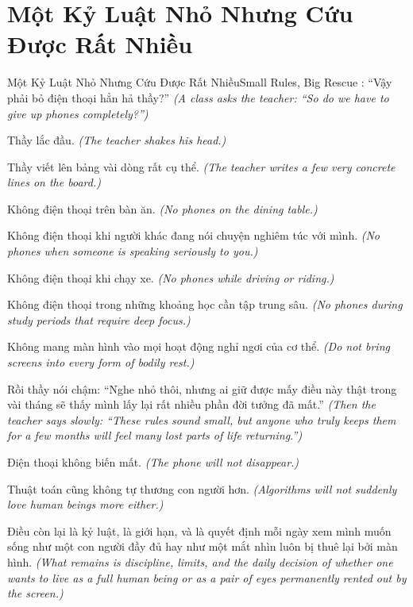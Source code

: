 \section{Một Kỷ Luật Nhỏ Nhưng Cứu Được Rất Nhiều}
\begin{truyen}{Một Kỷ Luật Nhỏ Nhưng Cứu Được Rất Nhiều}{Small Rules, Big Rescue}
: ``Vậy phải bỏ điện thoại hẳn hả thầy?''
\textit{(A class asks the teacher: ``So do we have to give up phones completely?'')}

Thầy lắc đầu.
\textit{(The teacher shakes his head.)}


Thầy viết lên bảng vài dòng rất cụ thể.
\textit{(The teacher writes a few very concrete lines on the board.)}

Không điện thoại trên bàn ăn.
\textit{(No phones on the dining table.)}

Không điện thoại khi người khác đang nói chuyện nghiêm túc với mình.
\textit{(No phones when someone is speaking seriously to you.)}

Không điện thoại khi chạy xe.
\textit{(No phones while driving or riding.)}

Không điện thoại trong những khoảng học cần tập trung sâu.
\textit{(No phones during study periods that require deep focus.)}

Không mang màn hình vào mọi hoạt động nghỉ ngơi của cơ thể.
\textit{(Do not bring screens into every form of bodily rest.)}

Rồi thầy nói chậm: ``Nghe nhỏ thôi, nhưng ai giữ được mấy điều này thật trong vài tháng sẽ thấy mình lấy lại rất nhiều phần đời tưởng đã mất.''
\textit{(Then the teacher says slowly: ``These rules sound small, but anyone who truly keeps them for a few months will feel many lost parts of life returning.'')}
\end{truyen}

\begin{tongketchuong}
Điện thoại không biến mất.
\textit{(The phone will not disappear.)}

Thuật toán cũng không tự thương con người hơn.
\textit{(Algorithms will not suddenly love human beings more either.)}

Điều còn lại là kỷ luật, là giới hạn, và là quyết định mỗi ngày xem mình muốn sống như một con người đầy đủ hay như một mắt nhìn luôn bị thuê lại bởi màn hình.
\textit{(What remains is discipline, limits, and the daily decision of whether one wants to live as a full human being or as a pair of eyes permanently rented out by the screen.)}
\end{tongketchuong}

